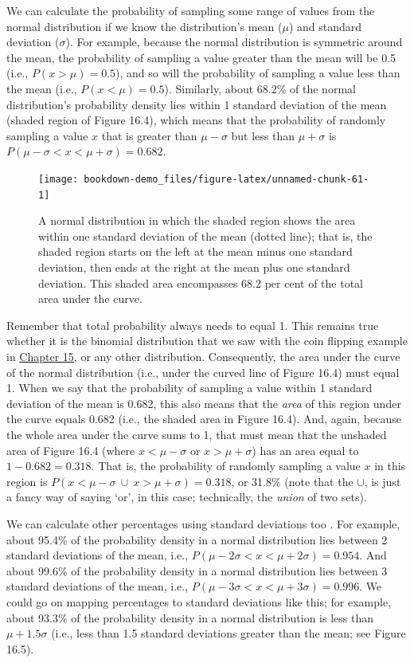 \documentclass[
  openany]{scrbook}
\begin{document}
We can calculate the probability of sampling some range of values from the normal distribution if we know the distribution's mean (\(\mu\)) and standard deviation (\(\sigma\)).
For example, because the normal distribution is symmetric around the mean, the probability of sampling a value greater than the mean will be 0.5 (i.e., \(P(x > \mu) = 0.5\)), and so will the probability of sampling a value less than the mean (i.e., \(P(x < \mu) = 0.5\)).
Similarly, about 68.2\% of the normal distribution's probability density lies within 1 standard deviation of the mean (shaded region of Figure 16.4), which means that the probability of randomly sampling a value \(x\) that is greater than \(\mu - \sigma\) but less than \(\mu + \sigma\) is \(P(\mu - \sigma < x < \mu + \sigma) = 0.682\).

\begin{figure}
\texttt{[image: bookdown-demo\_files/figure-latex/unnamed-chunk-61-1]} \caption{A normal distribution in which the shaded region shows the area within one standard deviation of the mean (dotted line); that is, the shaded region starts on the left at the mean minus one standard deviation, then ends at the right at the mean plus one standard deviation. This shaded area encompasses 68.2 per cent of the total area under the curve.}\label{fig:unnamed-chunk-61}
\end{figure}

Remember that total probability always needs to equal 1.
This remains true whether it is the binomial distribution that we saw with the coin flipping example in \protect\hyperlink{Chapter_15}{Chapter 15}, or any other distribution.
Consequently, the area under the curve of the normal distribution (i.e., under the curved line of Figure 16.4) must equal 1.
When we say that the probability of sampling a value within 1 standard deviation of the mean is 0.682, this also means that the \emph{area} of this region under the curve equals 0.682 (i.e., the shaded area in Figure 16.4).
And, again, because the whole area under the curve sums to 1, that must mean that the unshaded area of Figure 16.4 (where \(x < \mu -\sigma\) or \(x > \mu + \sigma\)) has an area equal to \(1 - 0.682 = 0.318\).
That is, the probability of randomly sampling a value \(x\) in this region is \(P(x < \mu - \sigma \: \cup \: x > \mu + \sigma) = 0.318\), or 31.8\% (note that the \(\cup\), is just a fancy way of saying `or', in this case; technically, the \emph{union} of two sets).

We can calculate other percentages using standard deviations too \citep{Sokal1995}.
For example, about 95.4\% of the probability density in a normal distribution lies between 2 standard deviations of the mean, i.e., \(P(\mu - 2\sigma < x < \mu + 2\sigma) = 0.954\).
And about 99.6\% of the probability density in a normal distribution lies between 3 standard deviations of the mean, i.e., \(P(\mu - 3\sigma < x < \mu + 3\sigma) = 0.996\).
We could go on mapping percentages to standard deviations like this; for example, about 93.3\% of the probability density in a normal distribution is less than \(\mu + 1.5\sigma\) (i.e., less than 1.5 standard deviations greater than the mean; see Figure 16.5).
\end{document}
